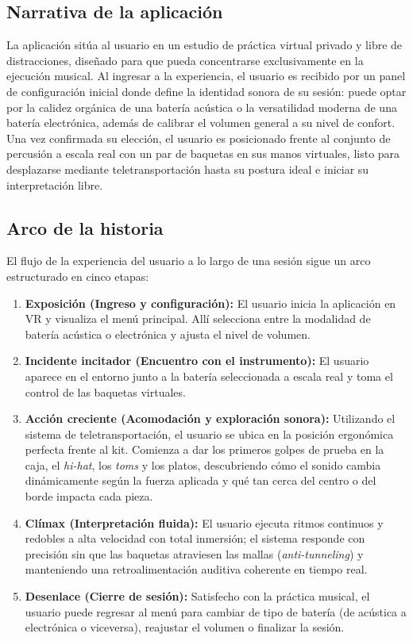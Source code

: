 \documentclass{article}
\begin{document}
\subsection{Narrativa de la aplicación}
La aplicación sitúa al usuario en un estudio de práctica virtual privado y libre de distracciones, diseñado para que pueda concentrarse exclusivamente en la ejecución musical. Al ingresar a la experiencia, el usuario es recibido por un panel de configuración inicial donde define la identidad sonora de su sesión: puede optar por la calidez orgánica de una batería acústica o la versatilidad moderna de una batería electrónica, además de calibrar el volumen general a su nivel de confort. Una vez confirmada su elección, el usuario es posicionado frente al conjunto de percusión a escala real con un par de baquetas en sus manos virtuales, listo para desplazarse mediante teletransportación hasta su postura ideal e iniciar su interpretación libre.

\subsection{Arco de la historia}
El flujo de la experiencia del usuario a lo largo de una sesión sigue un arco estructurado en cinco etapas:

\begin{enumerate}
    \item \textbf{Exposición (Ingreso y configuración):} El usuario inicia la aplicación en VR y visualiza el menú principal. Allí selecciona entre la modalidad de batería acústica o electrónica y ajusta el nivel de volumen.
    \item \textbf{Incidente incitador (Encuentro con el instrumento):} El usuario aparece en el entorno junto a la batería seleccionada a escala real y toma el control de las baquetas virtuales.
    \item \textbf{Acción creciente (Acomodación y exploración sonora):} Utilizando el sistema de teletransportación, el usuario se ubica en la posición ergonómica perfecta frente al kit. Comienza a dar los primeros golpes de prueba en la caja, el \textit{hi-hat}, los \textit{toms} y los platos, descubriendo cómo el sonido cambia dinámicamente según la fuerza aplicada y qué tan cerca del centro o del borde impacta cada pieza.
    \item \textbf{Clímax (Interpretación fluida):} El usuario ejecuta ritmos continuos y redobles a alta velocidad con total inmersión; el sistema responde con precisión sin que las baquetas atraviesen las mallas (\textit{anti-tunneling}) y manteniendo una retroalimentación auditiva coherente en tiempo real.
    \item \textbf{Desenlace (Cierre de sesión):} Satisfecho con la práctica musical, el usuario puede regresar al menú para cambiar de tipo de batería (de acústica a electrónica o viceversa), reajustar el volumen o finalizar la sesión.
\end{enumerate}
\end{document}

